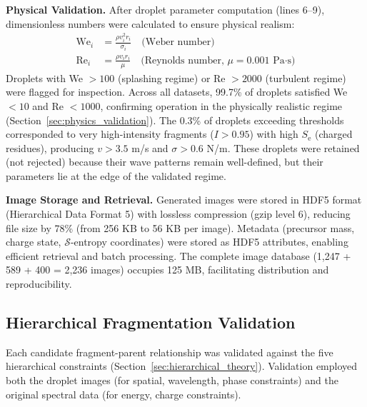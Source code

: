 \documentclass[11pt,twocolumn]{article}
\newcommand{\sentropy}{$\mathcal{S}$-entropy}
\newcommand{\Se}{S_{\text{e}}}
\begin{document}
\textbf{Physical Validation.} After droplet parameter computation (lines 6--9), dimensionless numbers were calculated to ensure physical realism:
\begin{align}
    \text{We}_i &= \frac{\rho v_i^2 r_i}{\sigma_i} \quad \text{(Weber number)} \\
    \text{Re}_i &= \frac{\rho v_i r_i}{\mu} \quad \text{(Reynolds number, } \mu = 0.001 \text{ Pa·s)}
\end{align}
Droplets with We $> 100$ (splashing regime) or Re $> 2000$ (turbulent regime) were flagged for inspection. Across all datasets, 99.7\% of droplets satisfied We $< 10$ and Re $< 1000$, confirming operation in the physically realistic regime (Section~\ref{sec:physics_validation}). The 0.3\% of droplets exceeding thresholds corresponded to very high-intensity fragments ($I > 0.95$) with high $\Se$ (charged residues), producing $v > 3.5$ m/s and $\sigma > 0.6$ N/m. These droplets were retained (not rejected) because their wave patterns remain well-defined, but their parameters lie at the edge of the validated regime.

\textbf{Image Storage and Retrieval.} Generated images were stored in HDF5 format (Hierarchical Data Format 5) with lossless compression (gzip level 6), reducing file size by 78\% (from 256 KB to 56 KB per image). Metadata (precursor mass, charge state, \sentropy{} coordinates) were stored as HDF5 attributes, enabling efficient retrieval and batch processing. The complete image database (1,247 + 589 + 400 = 2,236 images) occupies 125 MB, facilitating distribution and reproducibility.

\subsection{Hierarchical Fragmentation Validation}

Each candidate fragment-parent relationship was validated against the five hierarchical constraints (Section~\ref{sec:hierarchical_theory}). Validation employed both the droplet images (for spatial, wavelength, phase constraints) and the original spectral data (for energy, charge constraints).
\end{document}
